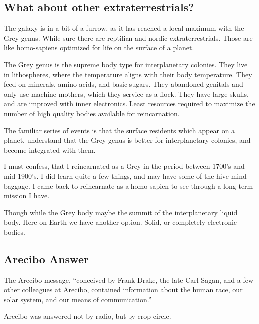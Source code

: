 \documentclass{report}
\begin{document}
\subsection{What about other extraterrestrials?}
The galaxy is in a bit of a furrow, as it has reached a local maximum with the
Grey genus. While sure there are reptilian and nordic extraterrestrials. Those
are like homo-sapiens optimized for life on the surface of a planet. 

The Grey genus is the supreme body type for interplanetary colonies. They live
in lithospheres, where the temperature aligns with their body temperature. They
feed on minerals, amino acids, and basic sugars. They abandoned genitals and
only use machine mothers, which they service as a flock. They have large skulls,
and are improved with inner electronics. Least resources
required to maximize the number of high quality bodies available for reincarnation. 

The familiar series of events is that the surface residents which appear on a
planet, understand that the Grey genus is better for interplanetary colonies, and
become integrated with them. 

I must confess, that I reincarnated as a Grey in the period between 1700's and
mid 1900's. I did learn quite a few things, and may have some of the hive mind 
baggage. I came back to reincarnate as a homo-sapien to see through a long term
mission I have.

Though while the Grey body maybe the summit of the interplanetary liquid body.
Here on Earth we have another option. Solid, or completely electronic bodies.

\subsection{Arecibo Answer}\label{arecibo}

The Arecibo message, ``conceived by Frank Drake, the late Carl Sagan, and a few
other colleagues at Arecibo, contained information about the human race, our
solar system, and our means of communication.''\cite{chilbolton}

Arecibo was answered not by radio, but by crop circle. 
\end{document}
